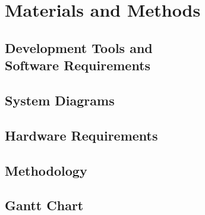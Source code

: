 \chapter{Materials and Methods}
\label{chap:methods}

\section{Development Tools and\\Software Requirements}
\label{sec:dev_tools}

\section{System Diagrams}
\label{sec:system_diagrams}

\section{Hardware Requirements}
\label{sec:hardware}

\section{Methodology}
\label{sec:methodology}

\section{Gantt Chart}
\label{sec:gantt_chart}